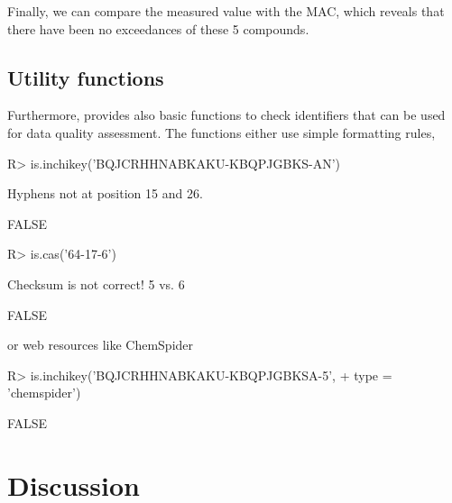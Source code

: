 \documentclass[article, shortnames]{jss}\usepackage[]{graphicx}\usepackage[]{color}
\begin{document}
Finally, we can compare the measured value with the MAC, which reveals that there have been no exceedances of these 5 compounds.




\subsection[Utility functions]{Utility functions}
Furthermore,  provides also basic functions to check identifiers that can be used for data quality assessment.
The functions either use simple formatting rules,

\begin{CodeChunk}
\begin{CodeInput}
R> is.inchikey('BQJCRHHNABKAKU-KBQPJGBKS-AN')
\end{CodeInput}
\begin{CodeOutput}
Hyphens not at position 15 and 26.
\end{CodeOutput}
\begin{CodeOutput}
[1] FALSE
\end{CodeOutput}
\begin{CodeInput}
R> is.cas('64-17-6')
\end{CodeInput}
\begin{CodeOutput}
Checksum is not correct! 5 vs. 6
\end{CodeOutput}
\begin{CodeOutput}
[1] FALSE
\end{CodeOutput}
\end{CodeChunk}

or web resources like ChemSpider
\begin{CodeChunk}
\begin{CodeInput}
R> is.inchikey('BQJCRHHNABKAKU-KBQPJGBKSA-5', 
+    type = 'chemspider')
\end{CodeInput}
\begin{CodeOutput}
[1] FALSE
\end{CodeOutput}
\end{CodeChunk}

\section[Discussion]{Discussion}
\end{document}
